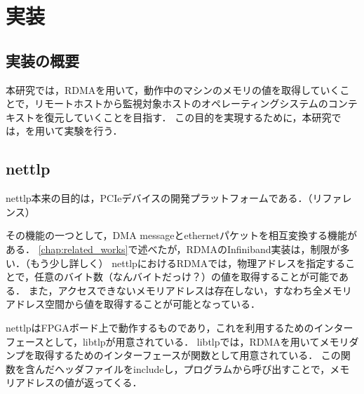 \chapter{実装}
\label{chap:implementation}




\section{実装の概要}

本研究では，RDMAを用いて，動作中のマシンのメモリの値を取得していくことで，リモートホストから監視対象ホストのオペレーティングシステムのコンテキストを復元していくことを目指す．
この目的を実現するために，本研究では，\cite{246316}を用いて実験を行う．

\section{nettlp}
\label{section:nettlp}

nettlp本来の目的は，PCIeデバイスの開発プラットフォームである．（リファレンス）

その機能の一つとして，DMA messageとethernetパケットを相互変換する機能がある．
\ref{chap:related_works}で述べたが，RDMAのInfiniband実装は，制限が多い．（もう少し詳しく）
nettlpにおけるRDMAでは，物理アドレスを指定することで，任意のバイト数（なんバイトだっけ？）の値を取得することが可能である．
また，アクセスできないメモリアドレスは存在しない，すなわち全メモリアドレス空間から値を取得することが可能となっている．

nettlpはFPGAボード上で動作するものであり，これを利用するためのインターフェースとして，libtlpが用意されている．
libtlpでは，RDMAを用いてメモリダンプを取得するためのインターフェースが関数として用意されている．
この関数を含んだヘッダファイルをincludeし，プログラムから呼び出すことで，メモリアドレスの値が返ってくる．


